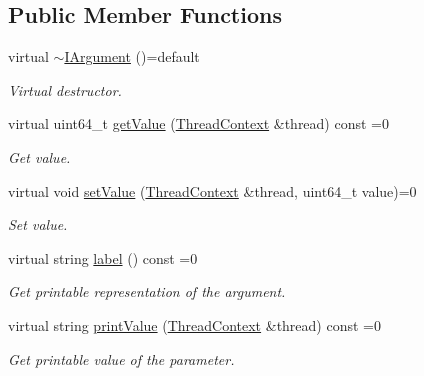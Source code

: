 \subsection*{Public Member Functions}
\begin{DoxyCompactItemize}
\item 
\mbox{\label{struct_evm_1_1_argument_1_1_i_argument_a46a050eab0061cce199ca390bb91ed0a}} 
virtual \mbox{\hyperlink{struct_evm_1_1_argument_1_1_i_argument_a46a050eab0061cce199ca390bb91ed0a}{$\sim$\+I\+Argument}} ()=default
\begin{DoxyCompactList}\small\item\em Virtual destructor. \end{DoxyCompactList}\item 
virtual uint64\+\_\+t \mbox{\hyperlink{struct_evm_1_1_argument_1_1_i_argument_af01db10f34498344831877847c2fc038}{get\+Value}} (\mbox{\hyperlink{struct_evm_1_1_thread_context}{Thread\+Context}} \&thread) const =0
\begin{DoxyCompactList}\small\item\em Get value. \end{DoxyCompactList}\item 
virtual void \mbox{\hyperlink{struct_evm_1_1_argument_1_1_i_argument_a24e4c76f2750e664e3895d2ff4b9146d}{set\+Value}} (\mbox{\hyperlink{struct_evm_1_1_thread_context}{Thread\+Context}} \&thread, uint64\+\_\+t value)=0
\begin{DoxyCompactList}\small\item\em Set value. \end{DoxyCompactList}\item 
virtual string \mbox{\hyperlink{struct_evm_1_1_argument_1_1_i_argument_a35bdae816e89f6f9fc393b6e03c5e521}{label}} () const =0
\begin{DoxyCompactList}\small\item\em Get printable representation of the argument. \end{DoxyCompactList}\item 
virtual string \mbox{\hyperlink{struct_evm_1_1_argument_1_1_i_argument_afcab2d2a1515518a111881a635c83da3}{print\+Value}} (\mbox{\hyperlink{struct_evm_1_1_thread_context}{Thread\+Context}} \&thread) const =0
\begin{DoxyCompactList}\small\item\em Get printable value of the parameter. \end{DoxyCompactList}\end{DoxyCompactItemize}


